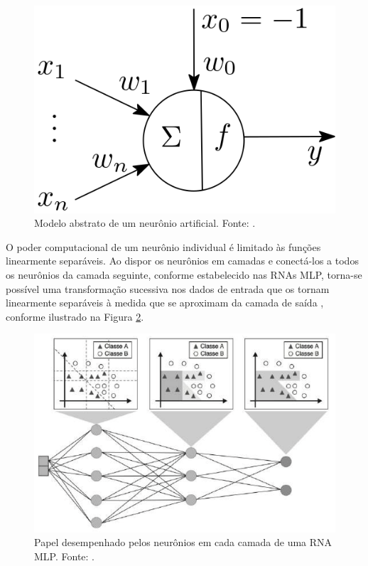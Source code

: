 \begin{figure}[ht]
\centering
\includegraphics[width=.5\textwidth]{./img/neuronio.png}
\caption{Modelo abstrato de um neurônio artificial. Fonte: \cite{Teresa:Livro}.}
\label{fig:neuronio}
\end{figure}

O poder computacional de um neurônio individual é limitado às funções linearmente separáveis. Ao dispor os neurônios em camadas e conectá-los a todos os neurônios da camada seguinte, conforme estabelecido nas RNAs MLP, torna-se possível uma transformação sucessiva nos dados de entrada que os tornam linearmente separáveis à medida que se aproximam da camada de saída \cite{Faceli:Livro}, conforme ilustrado na Figura \ref{fig:mlp}.

\begin{figure}[ht]
\centering
\includegraphics[width=.8\textwidth]{./img/mlp.png}
\caption{Papel desempenhado pelos neurônios em cada camada de uma RNA MLP. Fonte: \cite{Faceli:Livro}.}
\label{fig:mlp}
\end{figure}

